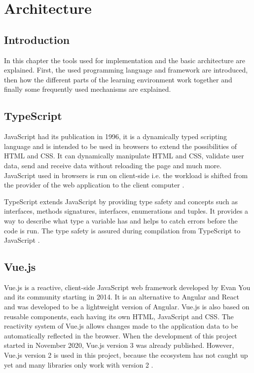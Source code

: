 \chapter{Architecture}
\label{chapter:architecture}

\section{Introduction}
\label{section:introduction}
In this chapter the tools used for implementation and the basic architecture are explained. First, the used programming language and framework are introduced, then how the different parts of the learning environment work together and finally some frequently used mechanisms are explained.

\section{TypeScript}
\label{section:typescript}
JavaScript had its publication in 1996, it is a dynamically typed scripting language and is intended to be used in browsers to extend the possibilities of HTML and CSS. It can dynamically manipulate HTML and CSS, validate user data, send and receive data without reloading the page and much more. JavaScript used in browsers is run on client-side i.e. the workload is shifted from the provider of the web application to the client computer \cite{Javascript}. 

TypeScript extends JavaScript by providing type safety and concepts such as interfaces, methods signatures, interfaces, enumerations and tuples. It provides a way to describe what type a variable has and helps to catch errors before the code is run. The type safety is assured during compilation from TypeScript to JavaScript \cite{Typescript}.

\section{Vue.js}
\label{section:vuejs}
Vue.js is a reactive, client-side JavaScript web framework developed by Evan You and its community starting in 2014. It is an alternative to Angular and React and was developed to be a lightweight version of Angular. Vue.js is also based on reusable components, each having its own HTML, JavaScript and CSS. The reactivity system of Vue.js allows changes made to the application data to be automatically reflected in the browser.
When the development of this project started in November 2020, Vue.js version 3 was already published. However, Vue.js version 2 is used in this project, because the ecosystem has not caught up yet and many libraries only work with version 2 \cite{Vue}.

